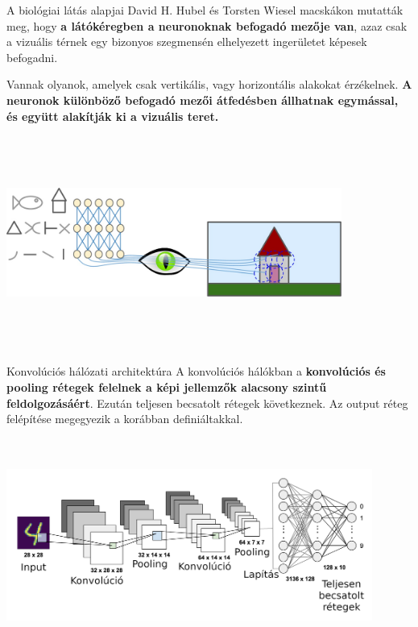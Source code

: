 \documentclass[english, aspectratio=169]{beamer}
\begin{document}
\begin{frame}{A biológiai látás alapjai}
David H. Hubel és Torsten Wiesel macskákon mutatták meg, hogy \textbf{a látókéregben a neuronoknak befogadó mezője van}, azaz csak a vizuális térnek egy bizonyos szegmensén elhelyezett ingerületet képesek befogadni.\par\smallskip
Vannak olyanok, amelyek csak vertikális, vagy horizontális alakokat érzékelnek. \textbf{A neuronok különböző befogadó mezői átfedésben állhatnak egymással, és együtt alakítják ki a vizuális teret.}\par\smallskip
\begin{center}
\includegraphics[width=11cm, height=7cm, keepaspectratio]{images/neural_8.png}
\end{center}
\end{frame}

\begin{frame}{Konvolúciós hálózati architektúra}
A konvolúciós hálókban a \textbf{konvolúciós és pooling rétegek felelnek a képi jellemzők alacsony szintű feldolgozásáért}. Ezután teljesen becsatolt rétegek következnek. Az output réteg felépítése megegyezik a korábban definiáltakkal.\par\smallskip
\begin{center}
\includegraphics[width=12cm, height=7cm, keepaspectratio]{images/neural_9.png}
\end{center}
\end{frame}
\end{document}
